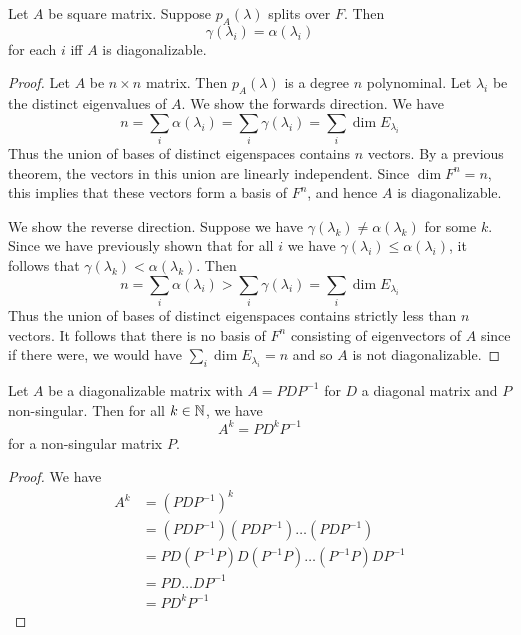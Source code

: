 \documentclass{article}
\begin{document}
\begin{cthm}
  Let $A$ be square matrix. Suppose $p_A(\lambda)$ splits over $F$. Then \[
    \gamma(\lambda_i) = \alpha(\lambda_i)
  \] for each $i$ iff $A$ is diagonalizable.
\end{cthm}
\begin{proof}
  Let $A$ be $n \times n$ matrix. Then $p_A(\lambda)$ is a degree $n$ polynominal. Let $\lambda_i$ be the distinct eigenvalues of $A$. We show the forwards direction. We have \[
    n = \sum_i \alpha(\lambda_i) = \sum_i \gamma(\lambda_i) = \sum_i \dim E_{\lambda_i}
  \]
  Thus the union of bases of distinct eigenspaces contains $n$ vectors. By a previous theorem, the vectors in this union are linearly independent. Since $\dim F^n = n$, this implies that these vectors form a basis of $F^n$, and hence $A$ is diagonalizable.

  We show the reverse direction. Suppose we have $\gamma(\lambda_k) \neq \alpha(\lambda_k)$ for some $k$. Since we have previously shown that for all $i$ we have $\gamma(\lambda_i) \leq \alpha(\lambda_i)$, it follows that $\gamma(\lambda_k) < \alpha(\lambda_k)$. Then \[
    n = \sum_i \alpha(\lambda_i) > \sum_i \gamma(\lambda_i) = \sum_i \dim E_{\lambda_i}
  \]
  Thus the union of bases of distinct eigenspaces contains strictly less than $n$ vectors. It follows that there is no basis of $F^n$ consisting of eigenvectors of $A$ since if there were, we would have $\sum_i \dim E_{\lambda_i} = n$ and so $A$ is not diagonalizable.
\end{proof}
\begin{theorem}
  Let $A$ be a diagonalizable matrix with $A = PDP^{-1}$ for $D$ a diagonal matrix and $P$ non-singular. Then for all $k \in \mathbb{N}$, we have \[
    A^k = PD^kP^{-1}
  \] for a non-singular matrix $P$.
\end{theorem}
\begin{proof}
  We have
  \begin{align*}
    A^k & = (PDP^{-1})^k                               \\
        & = (PDP^{-1})(PDP^{-1})\dots(PDP^{-1})        \\
        & = PD(P^{-1}P)D(P^{-1}P)\dots(P^{-1}P)DP^{-1} \\
        & = PD\dots DP^{-1}                            \\
        & = PD^kP^{-1}
  \end{align*}
\end{proof}
\end{document}
